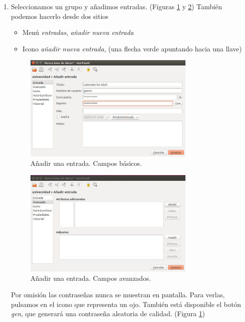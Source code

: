 \documentclass[a4paper,12pt]{article}
\begin{document}
\begin{enumerate}
    \item
Seleccionamos un grupo y añadimos entradas. 
(Figuras \ref{fig:kee3} y \ref{fig:kee4})
También podemos hacerlo desde dos sitios


\begin{itemize}
\item
Menú \emph{entradas}, \emph{añadir nueva entrada}

\item
Icono \emph{añadir nueva entrada}, (una flecha verde apuntando hacia 
una llave)
\end{itemize}

\begin{figure}[htpb]
  \centering
    \includegraphics[width=0.8\textwidth]{images/kee03}
  \caption{Añadir una entrada. Campos básicos.}
  \label{fig:kee3}
\end{figure}


\begin{figure}[htpb]
  \centering
    \includegraphics[width=0.8\textwidth]{images/kee04}
  \caption{Añadir una entrada. Campos avanzados.}
  \label{fig:kee4}
\end{figure}

Por omisión las contraseñas nunca se muestran en pantalla. Para verlas, pulsamos
en el icono que representa un ojo. También está disponible el botón \emph{gen},
que generará una contraseña aleatoria de calidad.
(Figura \ref{fig:kee3})


\end{enumerate}
\end{document}
